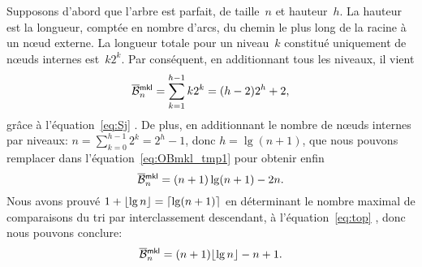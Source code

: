 Supposons d'abord que l'arbre est parfait, de taille~\(n\) et
hauteur~\(h\). La hauteur est la
longueur, comptée en nombre d'arcs, du chemin le plus long de la
racine à un n{\oe}ud externe. La longueur totale pour un niveau~\(k\)
constitué uniquement de n{\oe}uds internes est~\(k2^k\). Par
conséquent, en additionnant tous les niveaux, il vient
\begin{equation}
\OB{\fun{mkl}}{n} = \sum_{k=1}^{h-1}k2^k = (h-2)2^h + 2,
\label{eq:OBmkl_tmp1}
\end{equation}
grâce à l'équation~\eqref{eq:Sj} . De plus, en
additionnant le nombre de n{\oe}uds internes par niveaux: \(n =
\sum_{k=0}^{h-1}2^k = 2^{h} - 1\), donc \(h = \lg(n+1)\), que nous
pouvons remplacer dans l'équation~\eqref{eq:OBmkl_tmp1} pour obtenir
enfin
\begin{equation*}
\OB{\fun{mkl}}{n} = (n+1)\lg(n+1) - 2n.
\end{equation*}
Nous avons prouvé \(1 + \lfloor{\lg n}\rfloor = \lceil{\lg(n+1)}\rceil\) en
déterminant le nombre maximal de comparaisons du tri par
interclassement descendant, à l'équation~\eqref{eq:top}
, donc nous pouvons conclure:
\begin{equation}
\OB{\fun{mkl}}{n} = (n+1)\floor{\lg n} - n + 1.
\index{mkl@$\OB{\fun{mkl}}{n}$}
\label{eq:OBmkl_perfect}
\end{equation}

